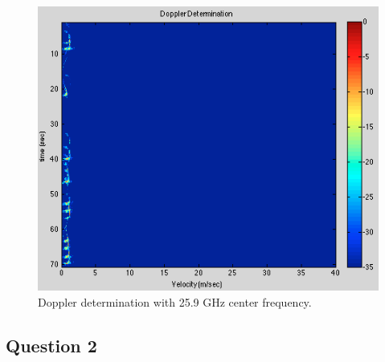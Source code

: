 \documentclass{article}
\begin{document}
\begin{figure}[ht]
\begin{minipage}[b]{0.33\linewidth}
\label{fig:f_c_reduced}
\end{minipage}
\begin{minipage}[b]{0.33\linewidth}
\centering
\includegraphics[width=\textwidth]{Figures/f_c_increased.png}
\caption{Doppler determination with 25.9 GHz center frequency.}
\label{fig:f_c_increased}
\end{minipage}
\end{figure}

\subsection{Question 2}
\end{document}
